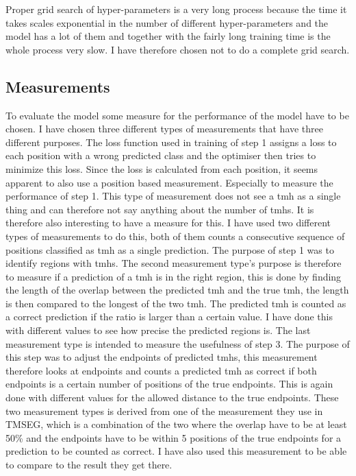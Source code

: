 Proper grid search of hyper-parameters is a very long process because the time it takes
scales exponential in the number of different hyper-parameters and the model has a lot 
of them and together with the fairly long training time is the whole process very slow.
I have therefore chosen not to do a complete grid search.


\subsection{Measurements}
To evaluate the model some measure for the performance of the model have to be chosen.
I have chosen three different types of measurements that have three different purposes.
The loss function used in training of step 1 assigns a loss to each position with a 
wrong predicted class and the optimiser then tries to minimize this loss. 
Since the loss is calculated from each position, it seems apparent to also use a 
position based measurement. Especially to measure the performance of step 1.
This type of measurement does not see a \gls{tmh} as a single thing and can therefore
not say anything about the number of \glspl{tmh}. It is therefore also interesting 
to have a measure for this. I have used two different types of measurements to do this, 
both of them counts a consecutive sequence of positions classified as \gls{tmh} as a single
prediction. The purpose of step 1 was to identify regions with \glspl{tmh}.
The second measurement type's purpose is therefore to measure if a prediction of a 
\gls{tmh} is in the right region, this is done by finding the length of the overlap 
between the predicted \gls{tmh} and the true \gls{tmh}, the length is then compared 
to the longest of the two \gls{tmh}. The predicted \gls{tmh} is counted as a correct prediction
if the ratio is larger than a certain value. I have done this with different values 
to see how precise the predicted regions is. 
The last measurement type is intended to measure the usefulness of step 3. The purpose of
this step was to adjust the endpoints of predicted \glspl{tmh}, this measurement 
therefore looks at endpoints and counts a predicted \gls{tmh} as correct if both endpoints 
is a certain number of positions of the true endpoints. This is again done with 
different values for the allowed distance to the true endpoints. 
These two measurement types is derived from one of the measurement they use in TMSEG,
which is a combination of the two where the overlap have to be at least 50\% and the 
endpoints have to be within 5 positions of the true endpoints for a prediction to be counted
as correct. I have also used this measurement to be able to compare to the result they get 
there. 


